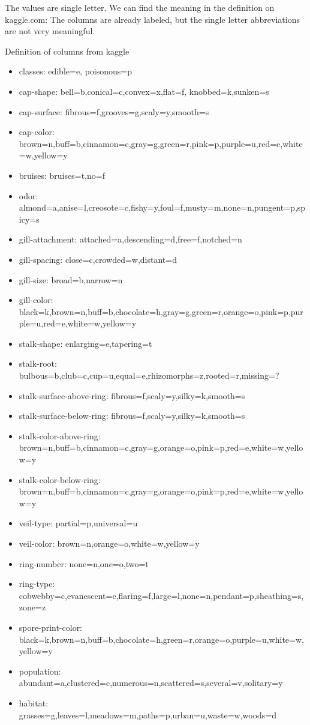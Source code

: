 \documentclass[]{article}
\providecommand{\tightlist}{%
  \setlength{\itemsep}{0pt}\setlength{\parskip}{0pt}}
\begin{document}
The values are single letter. We can find the meaning in the definition
on kaggle.com: The columns are already labeled, but the single letter
abbreviations are not very meaningful.

Definition of columns from kaggle

\begin{itemize}
\tightlist
\item
  classes: edible=e, poisonous=p
\item
  cap-shape: bell=b,conical=c,convex=x,flat=f, knobbed=k,sunken=s
\item
  cap-surface: fibrous=f,grooves=g,scaly=y,smooth=s
\item
  cap-color:
  brown=n,buff=b,cinnamon=c,gray=g,green=r,pink=p,purple=u,red=e,white=w,yellow=y
\item
  bruises: bruises=t,no=f
\item
  odor:
  almond=a,anise=l,creosote=c,fishy=y,foul=f,musty=m,none=n,pungent=p,spicy=s
\item
  gill-attachment: attached=a,descending=d,free=f,notched=n
\item
  gill-spacing: close=c,crowded=w,distant=d
\item
  gill-size: broad=b,narrow=n
\item
  gill-color:
  black=k,brown=n,buff=b,chocolate=h,gray=g,green=r,orange=o,pink=p,purple=u,red=e,white=w,yellow=y
\item
  stalk-shape: enlarging=e,tapering=t
\item
  stalk-root:
  bulbous=b,club=c,cup=u,equal=e,rhizomorphs=z,rooted=r,missing=?
\item
  stalk-surface-above-ring: fibrous=f,scaly=y,silky=k,smooth=s
\item
  stalk-surface-below-ring: fibrous=f,scaly=y,silky=k,smooth=s
\item
  stalk-color-above-ring:
  brown=n,buff=b,cinnamon=c,gray=g,orange=o,pink=p,red=e,white=w,yellow=y
\item
  stalk-color-below-ring:
  brown=n,buff=b,cinnamon=c,gray=g,orange=o,pink=p,red=e,white=w,yellow=y
\item
  veil-type: partial=p,universal=u
\item
  veil-color: brown=n,orange=o,white=w,yellow=y
\item
  ring-number: none=n,one=o,two=t
\item
  ring-type:
  cobwebby=c,evanescent=e,flaring=f,large=l,none=n,pendant=p,sheathing=s,zone=z
\item
  spore-print-color:
  black=k,brown=n,buff=b,chocolate=h,green=r,orange=o,purple=u,white=w,yellow=y
\item
  population:
  abundant=a,clustered=c,numerous=n,scattered=s,several=v,solitary=y
\item
  habitat: grasses=g,leaves=l,meadows=m,paths=p,urban=u,waste=w,woods=d
\end{itemize}
\end{document}
